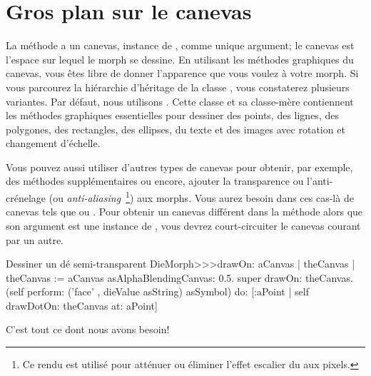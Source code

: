 \documentclass[a4paper,10pt,twoside]{book}
\begin{document}
\section{Gros plan sur le canevas}

La m\'ethode  a un canevas, instance de
, comme unique argument;
le canevas est l'espace sur lequel le morph se dessine.
En utilisant les m\'ethodes graphiques du canevas, vous \^etes libre
de donner l'apparence que vous voulez \`a votre morph.
Si vous parcourez la hi\'erarchie d'h\'eritage de la classe
, vous constaterez plusieurs variantes. Par d\'efaut, nous
utilisons . Cette classe et sa classe-m\`ere
 contiennent les m\'ethodes graphiques essentielles pour
dessiner des points, des lignes, des polygones, des rectangles, des
ellipses, du texte et des images avec rotation et changement d'\'echelle. 

Vous pouvez aussi utiliser d'autres types de canevas pour obtenir, par
exemple, des m\'ethodes suppl\'ementaires ou encore, ajouter la
transparence ou l'anti-cr\'enelage (ou
\emph{anti-aliasing}~\footnote{Ce rendu est utilis\'e pour att\'enuer
  ou \'eliminer l'effet escalier du aux pixels.}) aux morphs.  
Vous aurez besoin dans ces cas-l\`a de canevas tels que
 ou .
Pour obtenir un canevas diff\'erent dans la m\'ethode 
alors que son argument est une instance de , vous devrez
court-circuiter le canevas courant par un autre. 


\begin{method}{Dessiner un d\'e semi-transparent}
DieMorph>>>drawOn: aCanvas
	| theCanvas |
	theCanvas := aCanvas asAlphaBlendingCanvas: 0.5.
	super drawOn: theCanvas.
	(self perform: ('face' , dieValue asString) asSymbol)
		do: [:aPoint | self drawDotOn: theCanvas at: aPoint]
\end{method}
\noindent

C'est tout ce dont nous avons besoin! 
\end{document}
